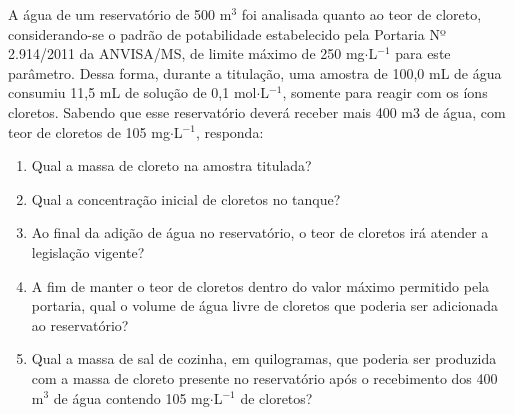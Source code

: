  A água de um reservatório de 500 m$^3$ foi analisada quanto ao teor de cloreto, considerando-se o padrão de potabilidade estabelecido pela Portaria Nº 2.914/2011 da ANVISA/MS, de limite máximo de 250 mg$\cdot$L$^{-1}$ para este parâmetro. Dessa forma, durante a titulação, uma amostra de 100,0 mL de água consumiu 11,5 mL de solução de  0,1 mol$\cdot$L$^{-1}$, somente para reagir com os íons cloretos. Sabendo que esse reservatório deverá receber mais 400 m3 de água, com teor de cloretos de 105 mg$\cdot$L$^{-1}$, responda: 

 \begin{enumerate}[label = (\alph*)]
	\item Qual a massa de cloreto na amostra titulada?
	\item Qual a concentração inicial de cloretos no tanque?
	\item Ao final da adição de água no reservatório, o teor de cloretos irá atender a legislação vigente? 
	\item A fim de manter o teor de cloretos dentro do valor máximo permitido pela portaria, qual o volume de água livre de cloretos que poderia ser adicionada ao reservatório? 
	\item Qual a massa de sal de cozinha, em quilogramas, que poderia ser produzida com a massa de cloreto presente no reservatório após o recebimento dos 400 m$^3$ de água contendo 105 mg$\cdot$L$^{-1}$ de cloretos?
\end{enumerate}
